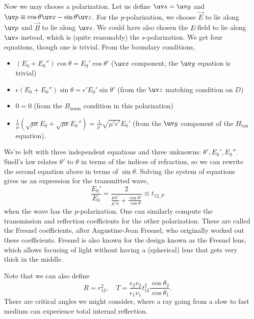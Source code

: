 Now we may choose a polarization. Let us define $\uv s=\uv y$ and $\uv p\equiv \cos \theta \uv x - \sin \theta \uv z$. For the $p$-polarization, we choose $\vec E$ to lie along $\uv p$ and $\vec B$ to lie along $\uv s$. We could have also chosen the $E$-field to lie along $\uv s$ instead, which is (quite reasonably) the $s$-polarization. We get four equations, though one is trivial. From the boundary conditions,
\begin{itemize}
    \item $(E_0+E_0'')\cos\theta=E_0'\cos\theta'$ ($\uv x$ component, the $\uv y$ equation is trivial)
    \item $\epsilon(E_0 + E_0'')\sin\theta =\epsilon'E_0'\sin\theta'$ (from the $\uv z$ matching condition on $D$)
    \item $0=0$ (from the $B_\text{norm}$ condition in this polarization)
    \item $\frac{1}{\mu}(\sqrt{\mu \epsilon}E_0+\sqrt{\mu\epsilon}E_0'')= \frac{1}{\mu'}\sqrt{\mu'\epsilon'} E_0'$ (from the $\uv y$ component of the $H_\text{tan}$ equation).
\end{itemize}

We're left with three independent equations and three unknowns: $\theta',E_0',E_0''$. %
Snell's law relates $\theta'$ to $\theta$ in terms of the indices of refraction, so we can rewrite the second equation above in terms of $\sin\theta$. 
Solving the system of equations gives us an expression for the transmitted wave,
\begin{equation}
    \frac{E_0'}{E_0} = \frac{2}{\frac{\mu n'}{\mu'n} + \frac{\cos\theta'}{\cos\theta}}\equiv t_{12,P}
\end{equation}
when the wave has the $p$-polarization. One can similarly compute the transmission and reflection coefficients for the other polarization. These are called the Fresnel coefficients, after Augustine-Jean Fresnel, who originally worked out these coefficients. Fresnel is also known for the design known as the Fresnel lens, which allows focusing of light without having a (spherical) lens that gets very thick in the middle.

Note that we can also define
\begin{equation}
    R=r_{12}^2,\quad T = \frac{\epsilon_2 v_2}{\epsilon_1v_1}t_{12}^2 \frac{\cos\theta_2}{\cos\theta_1}.
\end{equation}
There are critical angles we might consider, where a ray going from a slow to fast medium can experience total internal reflection.